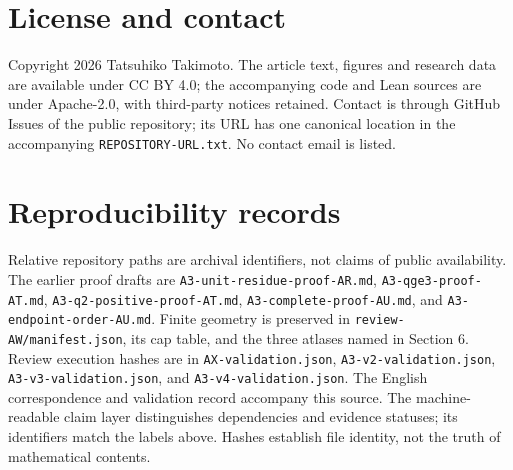 \documentclass[11pt]{amsart}
\newcommand{\record}[1]{\nolinkurl{#1}}
\begin{document}
\section*{License and contact}
Copyright 2026 Tatsuhiko Takimoto. The article text, figures and research
data are available under CC BY 4.0; the accompanying code and Lean
sources are under Apache-2.0, with third-party notices retained.
Contact is through GitHub Issues of the public repository; its URL
has one canonical location in the accompanying
\record{REPOSITORY-URL.txt}. No contact email is listed.

\section*{Reproducibility records}
Relative repository paths are archival identifiers, not claims of
public availability. The earlier proof drafts are
\record{A3-unit-residue-proof-AR.md}, \record{A3-qge3-proof-AT.md},
\record{A3-q2-positive-proof-AT.md}, \record{A3-complete-proof-AU.md},
and \record{A3-endpoint-order-AU.md}. Finite geometry is preserved in
\record{review-AW/manifest.json}, its cap table, and the three atlases
named in Section 6. Review execution hashes are in
\record{AX-validation.json}, \record{A3-v2-validation.json},
\record{A3-v3-validation.json}, and \record{A3-v4-validation.json}.
The English correspondence and validation record accompany this source.
The machine-readable claim layer distinguishes dependencies and
evidence statuses; its identifiers match the labels above. Hashes
establish file identity, not the truth of mathematical contents.
\end{document}
